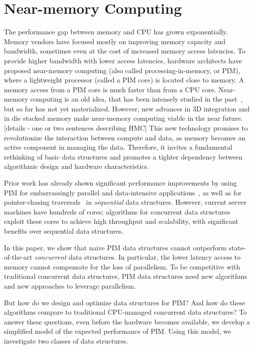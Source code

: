 \section{Near-memory Computing}

The performance gap between memory and CPU has grown exponentially. Memory vendors have focused mostly on improving memory capacity and bandwidth, sometimes even at the cost of increased memory access latencies. To provide higher bandwidth with lower access latencies, hardware architects have proposed near-memory computing (also called processing-in-memory, or PIM), where a lightweight processor (called a PIM core) is located close to memory. A memory access from a PIM core is much faster than from a CPU core. 
Near-memory computing is an old idea, that has been intensely studied in the past~\cite{}, but so far has not yet materialized. However, new advances in 3D integration and in die stacked memory make near-memory computing viable in the near future. 
[details - one or two sentences describing HMC] 
This new technology promises to revolutionize the interaction between compute and data, as memory becomes an active component in managing the data. Therefore, it invites a fundamental rethinking of basic data structures and promotes a tighter dependency between algorithmic design and hardware characteristics. 

Prior work has already shown significant performance improvements by using PIM for 
embarrassingly parallel and data-intensive applications~\cite{}, as well as for
pointer-chasing traversals~\cite{} in \emph{sequential} data structures. 
However, current server machines have hundreds of cores; algorithms for 
concurrent data structures exploit these cores to achieve high throughput and 
scalability, with significant benefits over sequential data structures. 

In this paper, we show that
  naive PIM data structures cannot outperform 
 state-of-the-art \emph{concurrent} data structures. In particular, 
the lower latency access to memory cannot compensate for the loss of 
parallelism. To be competitive with traditional concurrent data structures, 
PIM data structures need new algorithms and new approaches to leverage parallelism.  

But how do we design and optimize data structures for PIM? And how do these algorithms compare to traditional CPU-managed concurrent data structures? To answer these questions, even before the hardware becomes available, we develop a simplified model of the expected performance of PIM. Using this model, we 
investigate two classes of data structures. 

